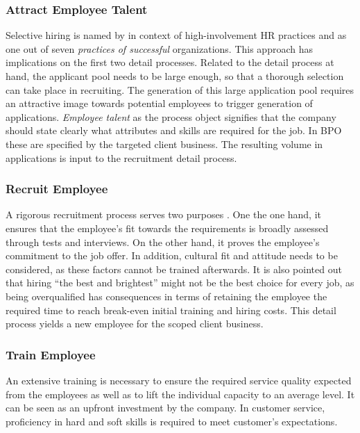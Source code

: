 	\subsubsection{Attract Employee Talent}
		Selective hiring is named by \cite{Batt2002} in context of high-involvement HR practices and \cite{pfeffer1998seven} as one out of seven \textit{practices of successful} organizations. This approach has implications on the first two detail processes. Related to the detail process at hand, the applicant pool needs to be large enough, so that a thorough selection can take place in recruiting. The generation of this large application pool requires an attractive image towards potential employees to trigger generation of applications. \textit{Employee talent} as the process object signifies that the company should state clearly what attributes and skills are required for the job. In \acrshort{BPO} these are specified by the targeted client business. The resulting volume in applications is input to the recruitment detail process. 
		
	\subsubsection{Recruit Employee}
		A rigorous recruitment process serves two purposes \citep[]{pfeffer1998seven}. One the one hand, it ensures that the employee's fit towards the requirements is broadly assessed through tests and interviews. On the other hand, it proves the employee's commitment to the job offer. In addition, cultural fit and attitude needs to be considered, as these factors cannot be trained afterwards. It is also pointed out that hiring \enquote{the best and brightest} might not be the best choice for every job, as being overqualified has consequences in terms of retaining the employee the required time to reach break-even \wrt initial training and hiring costs. This detail process yields a new employee for the scoped client business.
	\subsubsection{Train Employee}
		An extensive training is necessary to ensure the required service quality expected from the employees as well as to lift the individual capacity to an average level. It can be seen as an upfront investment by the company. In customer service, proficiency in hard and soft skills is required to meet customer's expectations. 
